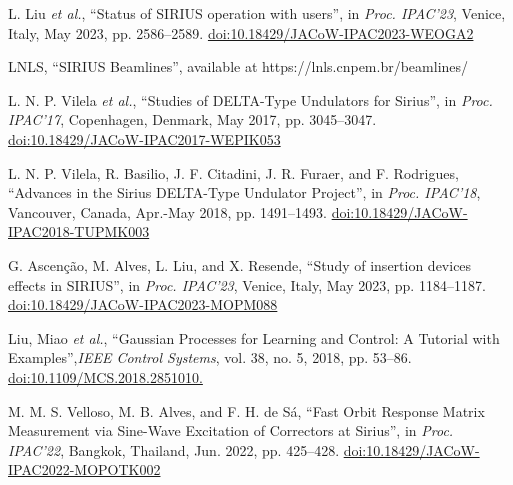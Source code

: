 \documentclass[a4paper,
               keeplastbox,   %
               ]{jacow}
\begin{document}
\begin{thebibliography}{14} %

   L. Liu \emph{et al.},
   \textquotedblleft{Status of SIRIUS operation with users}\textquotedblright,
   in \emph{Proc. IPAC’23}, Venice, Italy, May 2023, pp. 2586--2589.
   \url{doi:10.18429/JACoW-IPAC2023-WEOGA2}    
    

    LNLS,
    \textquotedblleft{SIRIUS Beamlines}\textquotedblright,
    available at https://lnls.cnpem.br/beamlines/

    L. N. P. Vilela \emph{et al.},
    \textquotedblleft{Studies of DELTA-Type Undulators for Sirius}\textquotedblright,
    in \emph{Proc. IPAC’17}, Copenhagen, Denmark, May 2017, pp. 3045--3047.
    \url{doi:10.18429/JACoW-IPAC2017-WEPIK053} 
    
   L. N. P. Vilela, R. Basilio, J. F. Citadini, J. R. Furaer, and F. Rodrigues,
   \textquotedblleft{Advances in the Sirius DELTA-Type Undulator Project}\textquotedblright,
   in \emph{Proc. IPAC’18}, Vancouver, Canada, Apr.-May 2018, pp. 1491--1493.
   \url{doi:10.18429/JACoW-IPAC2018-TUPMK003}  

   G. Ascenção, M. Alves, L. Liu, and X. Resende,
   \textquotedblleft{Study of insertion devices effects in SIRIUS}\textquotedblright,
   in \emph{Proc. IPAC’23}, Venice, Italy, May 2023, pp. 1184--1187.
   \url{doi:10.18429/JACoW-IPAC2023-MOPM088}    

    Liu, Miao \emph{et al.},  
    \textquotedblleft{Gaussian Processes for Learning and Control: A Tutorial with Examples}\textquotedblright,\emph{IEEE Control Systems}, vol. 38, no. 5, 2018, pp. 53–86.
    \url{doi:10.1109/MCS.2018.2851010. }

   M. M. S. Velloso, M. B. Alves, and F. H. de Sá,
   \textquotedblleft{Fast Orbit Response Matrix Measurement via Sine-Wave Excitation of Correctors at Sirius}\textquotedblright,
   in \emph{Proc. IPAC’22}, Bangkok, Thailand, Jun. 2022, pp. 425--428.
   \url{doi:10.18429/JACoW-IPAC2022-MOPOTK002}  
   

\end{thebibliography}
\end{document}

